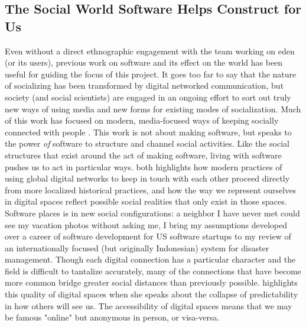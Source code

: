 \documentclass[a4paper,man,natbib]{apa6}
\begin{document}
  \subsection*{The Social World Software Helps Construct for Us}
   Even without a direct ethnographic engagement with the team working on \acrshort{eden} (or its users), previous work on software and its effect on the world has been useful for guiding the focus of this project. It goes too far to say that the nature of socializing has been transformed by digital networked communication, but society (and social scientists) are engaged in an ongoing effort to sort out truly new ways of using media and new forms for existing modes of socialization. Much of this work has focused on modern, media-focused ways of keeping socially connected with people \citep{Humphreys2018-ge,Jurgenson2019-tl,Tiidenberg2018-gh}. This work is not about making software, but speaks to the power \textit{of} software to structure and channel social activities. Like the social structures that exist around the act of making software, living with software pushes us to act in particular ways. \citet{Humphreys2018-ge} both highlights how modern practices of using global digital networks to keep in touch with each other proceed directly from more localized historical practices, and how the way we represent ourselves in digital spaces reflect possible social realities that only exist in those spaces. Software places is in new social configurations: a neighbor I have never met could see my vacation photos without asking me, I bring my assumptions developed over a career of software development for US software startups to my review of an internationally focused (but originally Indonesian) system for disaster management. Though each digital connection has a particular character and the field is difficult to tantalize accurately, many of the connections that have become more common bridge greater social distances than previously possible. \citet{Dean2010-lk} highlights this quality of digital spaces when she speaks about the collapse of predictability in how others will see us. The accessibility of digital spaces means that we may be famous "online" but anonymous in person, or visa-versa. 
\end{document}
